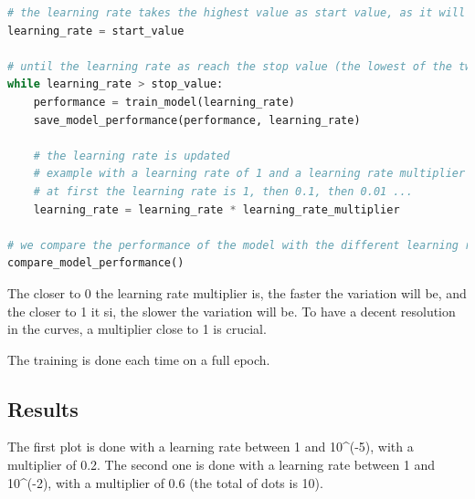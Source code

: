 \begin{lstlisting}[language=Python]
# the learning rate takes the highest value as start value, as it will decrease over time
learning_rate = start_value 

# until the learning rate as reach the stop value (the lowest of the two bounds), we make it vary logarithmically
while learning_rate > stop_value:
    performance = train_model(learning_rate)
    save_model_performance(performance, learning_rate)
    
    # the learning rate is updated
    # example with a learning rate of 1 and a learning rate multiplier of 0.1:
    # at first the learning rate is 1, then 0.1, then 0.01 ...
    learning_rate = learning_rate * learning_rate_multiplier

# we compare the performance of the model with the different learning rates
compare_model_performance()
\end{lstlisting}

The closer to 0 the learning rate multiplier is, the faster the
variation will be, and the closer to 1 it si, the slower the variation
will be. To have a decent resolution in the curves, a multiplier close
to 1 is crucial.

The training is done each time on a full epoch.

\subsection{Results}

The first plot is done with a learning rate between 1 and 10\^{}(-5),
with a multiplier of 0.2. The second one is done with a learning rate
between 1 and 10\^{}(-2), with a multiplier of 0.6 (the total of dots is
10).

